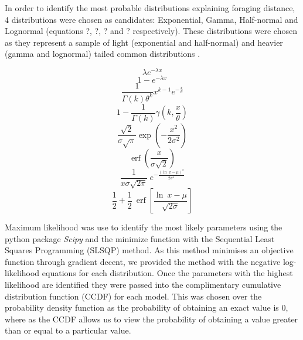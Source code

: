 \documentclass[11pt,usenames,dvipsnames,a4paper]{article}
\DeclareMathOperator\erf{erf}
\begin{document}
\begin{linenumbers}
\hspace{\parindent}
In order to identify the most probable distributions explaining foraging distance, 4 distributions were chosen as candidates: Exponential, Gamma, Half-normal and Lognormal (equations ?, ?, ? and ? respectively). These distributions were chosen as they represent a sample of light (exponential and half-normal) and heavier (gamma and lognormal) tailed common distributions \citep{Frank2009}.
\end{linenumbers}
\begin{equation}
\lambda e^{-\lambda x}
\end{equation}
\begin{equation}
1 - e^{-\lambda x}
\end{equation}
\begin{equation}
\frac{1}{\Gamma(k)\theta^k}x^{k-1}e^{-\frac{x}{\theta}}
\end{equation}
\begin{equation}
1 - \frac{1}{\Gamma(k)}\gamma(k,\frac{x}{\theta})
\end{equation}
\begin{equation}
\frac{\sqrt{2}}{\sigma \sqrt{\pi}} \exp \left(-\frac{x^2}{2 \sigma^2}\right)
\end{equation}
\begin{equation}
\erf\left(\frac{x}{\sigma \sqrt{2}}\right)
\end{equation}
\begin{equation}
\frac{1}{x \sigma \sqrt{2 \pi}}\ e^{- \frac{(\ln\ x - \mu)^2}{2\sigma^2}}
\end{equation}
\begin{equation}
\frac{1}{2} + \frac{1}{2}\ \erf\left[\frac{\ln\ x - \mu}{\sqrt{2 \sigma}}\right]
\end{equation}

\begin{linenumbers}
Maximum likelihood was use to identify the most likely parameters using the python package \textit{Scipy} and the minimize function with the Sequential Least Squares Programming (SLSQP) method. As this method minimises an objective function through gradient decent, we provided the method with the negative log-likelihood equations for each distribution. Once the parameters with the highest likelihood are identified they were passed into the complimentary cumulative distribution function (CCDF) for each model. This was chosen over the probability density function as the probability of obtaining an exact value is 0, where as the CCDF allows us to view the probability of obtaining a value greater than or equal to a particular value. 
\end{linenumbers}
\end{document}
